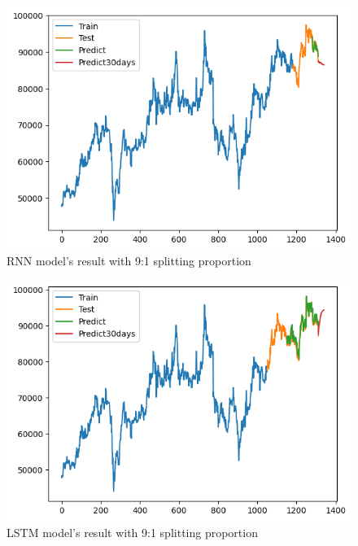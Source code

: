 \documentclass{ieeeojies}
\begin{document}
\begin{figure}[H]
  \centering
  \begin{minipage}{0.6\linewidth}
    \centering
    \includegraphics[width=\linewidth]{bibliography/diagram/RNN-VCB-9-1.png}
    \caption{RNN model’s result with 9:1 splitting proportion}
    \label{fig8}
  \end{minipage}
\end{figure}

\begin{figure}[H]
  \centering
  \begin{minipage}{0.6\linewidth}
    \centering
    \includegraphics[width=\linewidth]{bibliography/diagram/LSTM-VCB.png}
    \caption{LSTM model’s result with 9:1 splitting proportion}
    \label{fig8}
  \end{minipage}
\end{figure}
\end{document}
